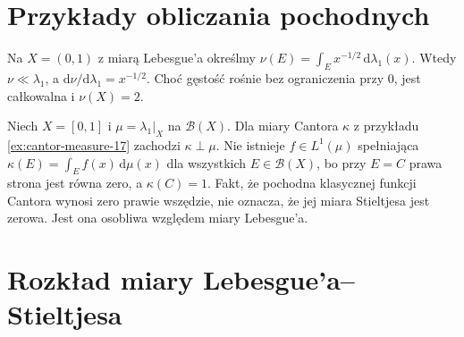 \section{Przykłady obliczania pochodnych}
\begin{przyklad}
Na $X=(0,1)$ z miarą Lebesgue'a określmy
$\nu(E)=\int_E x^{-1/2}\,\mathrm d\lambda_1(x)$.
Wtedy $\nu\ll\lambda_1$, a
$\mathrm d\nu/\mathrm d\lambda_1=x^{-1/2}$.
Choć gęstość rośnie bez ograniczenia przy $0$,
jest całkowalna i $\nu(X)=2$.
\end{przyklad}

\begin{przyklad}
Niech $X=[0,1]$ i $\mu=\lambda_1|_X$ na
$\mathcal B(X)$. Dla miary Cantora $\kappa$ z przykładu
\ref{ex:cantor-measure-17} zachodzi $\kappa\perp\mu$.
Nie istnieje $f\in L^1(\mu)$ spełniająca
$\kappa(E)=\int_Ef(x)\,\mathrm d\mu(x)$ dla wszystkich
$E\in\mathcal B(X)$, bo przy $E=C$ prawa strona
jest równa zero, a $\kappa(C)=1$.
Fakt, że pochodna klasycznej funkcji Cantora wynosi
zero prawie wszędzie, nie oznacza, że jej miara
Stieltjesa jest zerowa. Jest ona osobliwa względem
miary Lebesgue'a.
\end{przyklad}

\section{Rozkład miary Lebesgue'a--Stieltjesa}

